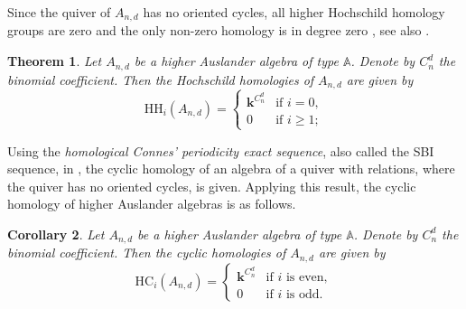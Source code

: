 \documentclass{amsart}
\newcommand{\A}{\mathbb{A}}
\newcommand{\bk}{\mathbf{k}}
\newcommand{\HH}{\mathrm{HH}}
\newcommand{\HC}{\mathrm{HC}}
\theoremstyle{plain}
\newtheorem{Thm}{Theorem}[section]
\newtheorem{Cor}[Thm]{Corollary}
\theoremstyle{definition}
\numberwithin{equation}{section}
\newcommand{\can}[1]{\textcolor{red}{#1 } }
\begin{document}
Since the quiver of $A_{n,d}$ has no oriented cycles, all higher Hochschild homology groups are zero and the only non-zero homology is in degree zero \cite{Cibils86}, see also \cite{Han06}. 

\begin{Thm}\label{thm:Hoch-homology}
Let $A_{n,d}$ be a higher Auslander algebra of type $\A$. Denote by $C_n^d$  the binomial coefficient. Then 
 the Hochschild homologies of $A_{n,d}$ are given by \[\HH_i(A_{n,d})=\begin{cases}
        \bk^{C_n^d} & \text{if $i=0$},\\ 0 & \text{if $i\ge 1$};
    \end{cases}\]
\end{Thm}



Using  the {\it homological Connes' periodicity exact sequence}, also called the SBI sequence, in \cite{Cibils86}, the cyclic homology of an algebra of a quiver with relations, where the quiver has no oriented cycles, is given. Applying this result, the cyclic homology of higher Auslander algebras is as follows.


\begin{Cor}\label{cor:cyclic-homology}
Let $A_{n,d}$ be a higher Auslander algebra of type $\A$. Denote by $C_n^d$  the binomial coefficient. Then 
 the cyclic homologies of $A_{n,d}$ are given by \[\HC_i(A_{n,d})=\begin{cases}
        \bk^{C_n^d} & \text{if $i$ is even},\\ 0 & \text{if $i$ is odd}.
    \end{cases}\]
   
\end{Cor}

\end{document}
